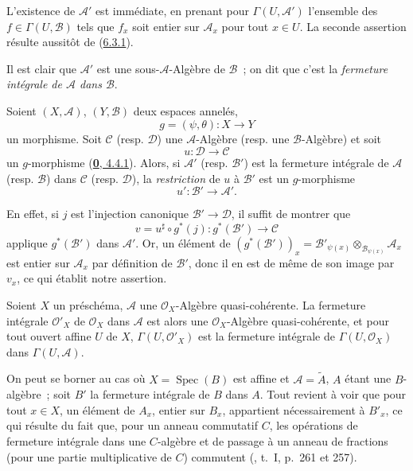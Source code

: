 L'existence de $\mathcal{A}'$ est immédiate, en prenant pour
$\Gamma(U,\mathcal{A}')$ l'ensemble des $f\in\Gamma(U,\mathcal{B})$ tels que
$f_x$ soit entier sur $\mathcal{A}_x$ pour tout $x\in U$. La seconde
assertion résulte aussitôt de (\hyperref[II.6.3.1-fr]{6.3.1}).

Il est clair que $\mathcal{A}'$ est une sous-$\mathcal{A}$-Algèbre de
$\mathcal{B}$~; on dit que c'est la \emph{fermeture intégrale de
$\mathcal{A}$ dans $\mathcal{B}$}.

\begin{env}[6.3.3]
\label{II.6.3.3-fr}
Soient $(X,\mathcal{A})$, $(Y,\mathcal{B})$ deux espaces annelés,
\[
g=(\psi,\theta):X\to Y
\]
un morphisme. Soit $\mathcal{C}$ (resp. $\mathcal{D}$) une
$\mathcal{A}$-Algèbre (resp. une $\mathcal{B}$-Algèbre) et soit
\[
u:\mathcal{D}\to\mathcal{C}
\]
un $g$-morphisme (\hyperref[0.4.4.1-fr]{\textbf{0}, 4.4.1}). Alors, si
$\mathcal{A}'$ (resp. $\mathcal{B}'$) est la fermeture intégrale de
$\mathcal{A}$ (resp. $\mathcal{B}$) dans $\mathcal{C}$ (resp.
$\mathcal{D}$), la \emph{restriction} de $u$ à $\mathcal{B}'$ est un
$g$-morphisme
\[
u':\mathcal{B}'\to\mathcal{A}'.
\]

En effet, si $j$ est l'injection canonique $\mathcal{B}'\to\mathcal{D}$, il
suffit de montrer que
\[
v=u^\sharp\circ g^*(j):g^*(\mathcal{B}')\to\mathcal{C}
\]
applique $g^*(\mathcal{B}')$ dans $\mathcal{A}'$. Or, un élément de
$(g^*(\mathcal{B}'))_x=\mathcal{B}'_{\psi(x)}\otimes_{\mathcal{B}_{\psi(x)}}
\mathcal{A}_x$ est entier sur $\mathcal{A}_x$ par définition de
$\mathcal{B}'$, donc il en est de même de son image par $v_x$, ce qui établit
notre assertion.
\end{env}

\begin{proposition}[6.3.4]
\label{II.6.3.4-fr}
Soient $X$ un préschéma, $\mathcal{A}$ une $\mathcal{O}_X$-Algèbre
quasi-cohérente. La fermeture intégrale $\mathcal{O}'_X$ de
$\mathcal{O}_X$ dans $\mathcal{A}$ est alors une $\mathcal{O}_X$-Algèbre
quasi-cohérente, et pour tout ouvert affine $U$ de $X$,
$\Gamma(U,\mathcal{O}'_X)$ est la fermeture intégrale de
$\Gamma(U,\mathcal{O}_X)$ dans $\Gamma(U,\mathcal{A})$.
\end{proposition}

On peut se borner au cas où $X=\operatorname{Spec}(B)$ est affine et
$\mathcal{A}=\widetilde{A}$, $A$ étant une
$B$-algèbre~; soit $B'$ la fermeture intégrale de $B$ dans $A$. Tout revient
à voir que pour tout $x\in X$, un élément de $A_x$, entier sur $B_x$,
appartient nécessairement à $B'_x$, ce qui résulte du fait que, pour un anneau
commutatif $C$, les opérations de fermeture intégrale dans une $C$-algèbre et
de passage à un anneau de fractions (pour une partie multiplicative de $C$)
commutent (\cite{I-13}, t.~I, p.~261 et 257).


